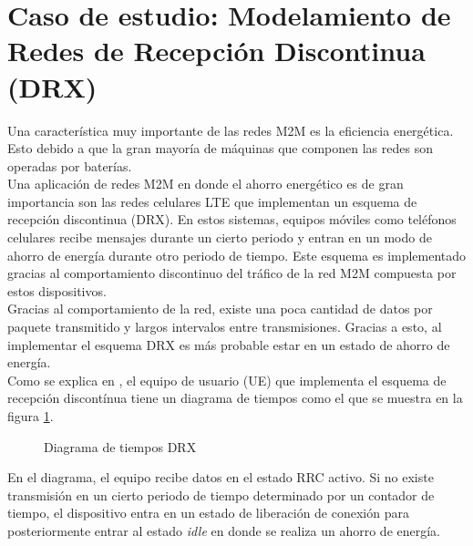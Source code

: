 \documentclass[journal]{IEEEtran}
\begin{document}
\section{Caso de estudio: Modelamiento de Redes de Recepción Discontinua (DRX)}

Una característica muy importante de las redes M2M es la eficiencia energética. Esto debido a que la gran mayoría de máquinas que componen las redes son operadas por baterías.\\

Una aplicación de redes M2M en donde el ahorro energético es de gran importancia son las redes celulares LTE que implementan un esquema de recepción discontinua (DRX). En estos sistemas, equipos móviles como teléfonos celulares recibe mensajes durante un cierto periodo y entran en un modo de ahorro de energía durante otro periodo de tiempo. Este esquema es implementado gracias al comportamiento discontinuo del tráfico de la red M2M compuesta por estos dispositivos.\\

Gracias al comportamiento de la red, existe una poca cantidad de datos por paquete transmitido y largos intervalos entre transmisiones. Gracias a esto, al implementar el esquema DRX es más probable estar en un estado de ahorro de energía.\\

Como se explica en \cite{paper2}, el equipo de usuario (UE) que implementa el esquema de recepción discontínua tiene un diagrama de tiempos como el que se muestra en la figura \ref{tiemposDRX}. 

\begin{figure}[h]
\centering
{}
\caption{Diagrama de tiempos DRX}
\label{tiemposDRX}
\end{figure}

En el diagrama, el equipo recibe datos en el estado RRC activo. Si no existe transmisión en un cierto periodo de tiempo determinado por un contador de tiempo, el dispositivo entra en un estado de liberación de conexión para posteriormente entrar al estado \textit{idle} en donde se realiza un ahorro de energía.\\
\end{document}
